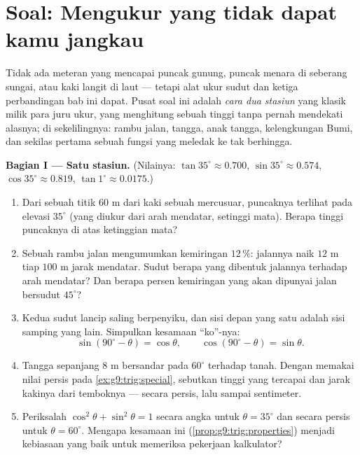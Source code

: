 \section{Soal: Mengukur yang tidak dapat kamu jangkau}

\begin{problem}
\label{pb:g9:trig:1}
Tidak ada meteran yang mencapai puncak gunung, puncak menara di
seberang sungai, atau kaki langit di laut --- tetapi alat ukur sudut
dan ketiga perbandingan bab ini dapat. Pusat soal ini adalah
\emph{cara dua stasiun} yang klasik milik para juru ukur, yang
menghitung sebuah tinggi tanpa pernah mendekati alasnya; di
sekelilingnya: rambu jalan, tangga, anak tangga, kelengkungan
Bumi, dan sekilas pertama sebuah fungsi yang meledak ke tak berhingga.

\medskip
\noindent\textbf{Bagian I --- Satu stasiun.}
(Nilainya: $\tan 35^\circ \approx 0.700$,
$\sin 35^\circ \approx 0.574$, $\cos 35^\circ \approx 0.819$,
$\tan 1^\circ \approx 0.0175$.)
\begin{enumerate}
  \item Dari sebuah titik $60$ m dari kaki sebuah mercusuar,
        puncaknya terlihat pada elevasi $35^\circ$ (yang diukur dari
        arah mendatar, setinggi mata). Berapa tinggi puncaknya di
        atas ketinggian mata?
  \item Sebuah rambu jalan mengumumkan kemiringan $12\,\%$: jalannya
        naik $12$ m tiap $100$ m jarak mendatar. Sudut berapa yang
        dibentuk jalannya terhadap arah mendatar? Dan berapa persen
        kemiringan yang akan dipunyai jalan bersudut $45^\circ$?
  \item Kedua sudut lancip  saling
        berpenyiku, dan sisi depan yang satu adalah sisi samping
        yang lain. Simpulkan kesamaan ``ko''-nya:
        \[
        \sin(90^\circ - \theta) = \cos\theta,
        \qquad
        \cos(90^\circ - \theta) = \sin\theta .
        \]
  \item Tangga sepanjang $8$ m bersandar pada $60^\circ$ terhadap
        tanah. Dengan memakai nilai persis pada
        \cref{ex:g9:trig:special}, sebutkan tinggi yang tercapai dan
        jarak kakinya dari temboknya --- secara persis, lalu sampai
        sentimeter.
  \item Periksalah $\cos^2\theta + \sin^2\theta = 1$ secara angka
        untuk $\theta = 35^\circ$ dan secara persis untuk
        $\theta = 60^\circ$. Mengapa kesamaan ini
        (\cref{prop:g9:trig:properties}) menjadi kebiasaan yang baik
        untuk memeriksa pekerjaan kalkulator?
\end{enumerate}


\end{problem}
